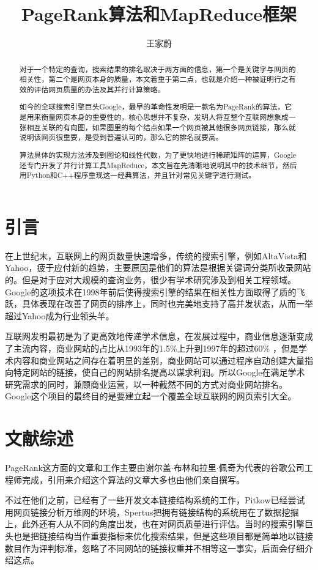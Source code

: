 \documentclass[a4paper, 14pt, twocolumn]{article}
\title{PageRank算法和MapReduce框架}
\author{王家蔚}
\theoremstyle{definition}
\begin{document}
	
\maketitle


\begin{abstract}
对于一个特定的查询，搜索结果的排名取决于两方面的信息，第一个是关键字与网页的相关性，第二个是网页本身的质量，本文着重于第二点，也就是介绍一种被证明行之有效的评估网页质量的办法及其并行计算策略。

如今的全球搜索引擎巨头Google，最早的革命性发明是一款名为PageRank的算法，它是用来衡量网页本身的重要性的，核心思想并不复杂，发明人将互整个互联网想象成一张相互关联的有向图，如果图里的每个结点如果一个网页被其他很多网页链接，那么就说明该网页很重要，是受到普遍认可的，那么它的排名就要高。\cite{SearchEngine}

算法具体的实现方法涉及到图论和线性代数，为了更快地进行稀疏矩阵的运算，Google还专门开发了并行计算工具MapReduce，本文旨在先清晰地说明其中的技术细节，然后用Python和C++程序重现这一经典算法，并且针对常见关键字进行测试。
\end{abstract}

\section{引言}
在上世纪末，互联网上的网页数量快速增多，传统的搜索引擎，例如AltaVista和Yahoo，疲于应付新的趋势，主要原因是他们的算法是根据关键词分类所收录网站的。\cite{Wave}但是对于应对大规模的查询业务，很少有学术研究涉及到相关工程领域。Google的这项技术在1998年前后使得搜索引擎的结果在相关性方面取得了质的飞跃，具体表现在改善了网页的排序上，同时也完美地支持了高并发状态，从而一举超过Yahoo成为行业领头羊。

互联网发明最初是为了更高效地传递学术信息，在发展过程中，商业信息逐渐变成了主流内容，商业网站的占比从1993年的1.5\%上升到1997年的超过60\% \cite{Web}，但是学术内容和商业网站之间存在着明显的差别，商业网站可以通过程序自动创建大量指向特定网站的链接，使自己的网站排名提高以谋求利润。所以Google在满足学术研究需求的同时，兼顾商业运营，以一种截然不同的方式对商业网站排名。Google这个项目的最终目的是要建立起一个覆盖全球互联网的网页索引大全。
\section{文献综述}
PageRank这方面的文章和工作主要由谢尔盖$\cdot$布林和拉里$\cdot$佩奇为代表的谷歌公司工程师完成，引用来介绍这个算法的文章大多也由他们亲自撰写。

不过在他们之前，已经有了一些开发文本链接结构系统的工作，Pitkow已经尝试用网页链接分析万维网的环境\cite{Ecology}，Spertus把拥有链接结构的系统用在了数据挖掘上\cite{mining}，此外还有人从不同的角度出发，也在对网页质量进行评估\cite{library}。当时的搜索引擎巨头也是把链接结构当作重要指标来优化搜索结果，但是这些项目都是简单地以链接数目作为评判标准，忽略了不同网站的链接权重并不相等这一事实，后面会仔细介绍这点。
\end{document}
